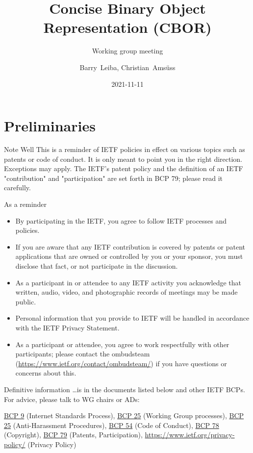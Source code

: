 \documentclass[aspectratio=169]{beamer}
\title{Concise Binary Object Representation (CBOR)}
\subtitle{Working group meeting}
\author{Barry~Leiba, Christian~Amsüss}
\institute{\normalsize{\theietf, online}}
\date{2021-11-11}
\begin{document}
\frame{\titlepage}

\section*{Preliminaries}

\begin{frame}{Note Well}\scriptsize
This is a reminder of IETF policies in effect on various topics such as patents or code of conduct. It is only meant to point you in the right direction. Exceptions may apply. The IETF's patent policy and the definition of an IETF "contribution" and "participation" are set forth in BCP 79; please read it carefully.

    \begin{block}{\small As a reminder\qquad\mbox{}}

    \vspace{-1.65em}

    \begin{itemize}
        \item By participating in the IETF, you agree to follow IETF processes and policies.
        \item If you are aware that any IETF contribution is covered by patents or patent applications that are owned or controlled by you or your sponsor, you must disclose that fact, or not participate in the discussion.
        \item As a participant in or attendee to any IETF activity you acknowledge that written, audio, video, and photographic records of meetings may be made public.
        \item Personal information that you provide to IETF will be handled in accordance with the IETF Privacy Statement.
        \item As a participant or attendee, you agree to work respectfully with other participants; please contact the ombudsteam (\url{https://www.ietf.org/contact/ombudsteam/}) if you have questions or concerns about this.
    \end{itemize}

    \end{block}

    \vspace{-1em}
    \begin{block}{\small Definitive information}
\ldots is in the documents listed below and other IETF BCPs. For advice, please talk to WG chairs or ADs:

\href{https://www.rfc-editor.org/info/bcp9}{BCP 9} (Internet Standards Process),
\href{https://www.rfc-editor.org/info/bcp25}{BCP 25} (Working Group processes),
\href{https://www.rfc-editor.org/info/bcp25}{BCP 25} (Anti-Harassment Procedures),
\href{https://www.rfc-editor.org/info/bcp54}{BCP 54} (Code of Conduct),
\href{https://www.rfc-editor.org/info/bcp78}{BCP 78} (Copyright),
\href{https://www.rfc-editor.org/info/bcp79}{BCP 79} (Patents, Participation),
\url{https://www.ietf.org/privacy-policy/} (Privacy Policy)
    \end{block}
\end{frame}
\end{document}
